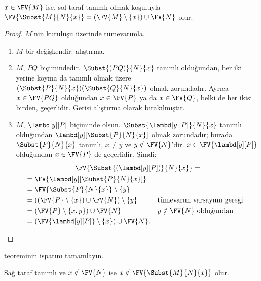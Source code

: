 \documentclass[../../../include/open-logic-section]{subfiles}
\begin{document}
\begin{thm} 
  $x \in \FV{M}$ ise, sol taraf tanımlı olmak koşuluyla
  $\FV{\Subst{M}{N}{x}} = (\FV{M} \setminus \{x\}) \cup \FV{N}$ olur.
\end{thm}

\begin{proof}
  $M$'nin kuruluşu üzerinde tümevarımla.
  \begin{enumerate}
  \item $M$ bir değişkendir: alıştırma.
  \item $M$, $PQ$ biçimindedir. $\Subst{(PQ)}{N}{x}$ tanımlı olduğundan,
    her iki yerine koyma da tanımlı olmak üzere
    $(\Subst{P}{N}{x})(\Subst{Q}{N}{x})$ olmak zorundadır. Ayrıca
    $x\in\FV{PQ}$ olduğundan $x\in\FV{P}$ ya da $x\in\FV{Q}$, belki de
    her ikisi birden, geçerlidir. Gerisi alıştırma olarak bırakılmıştır.
  \item $M$, $\lambd[y][P]$ biçiminde olsun.
    $\Subst{\lambd[y][P]}{N}{x}$ tanımlı olduğundan
    $\lambd[y][\Subst{P}{N}{x}]$ olmak zorundadır; burada
    $\Subst{P}{N}{x}$ tanımlı, $x\neq y$ ve $y\notin\FV{N}$'dir.
    $x\in\FV{\lambd[y][P]}$ olduğundan $x\in\FV{P}$ de geçerlidir. Şimdi:
    \begin{multline*}
      \FV{\Subst{(\lambd[y][P])}{N}{x}} = \\
      \begin{aligned}
      & = \FV{\lambd[y][\Subst{P}{N}{x}]} \\
      & = \FV{\Subst{P}{N}{x}} \setminus \{y\} \\
      & = ((\FV{P} \setminus \{x\}) \cup \FV{N}) \setminus \{y\}
       && \text{tümevarım varsayımı gereği} \\
      & = (\FV{P} \setminus \{x, y\}) \cup \FV{N}
       && \text{$y \notin \FV{N}$ olduğundan} \\
      & = (\FV{\lambd[y][P]} \setminus \{x\}) \cup \FV{N}.
      \end{aligned}
      \end{multline*}
  \end{enumerate}
\end{proof}

\begin{prob}
   teoreminin ispatını tamamlayın.
\end{prob}

\begin{thm}
  Sağ taraf tanımlı ve $x\notin\FV{N}$ ise
  $x \notin \FV{\Subst{M}{N}{x}}$ olur.
\end{thm}
\end{document}
